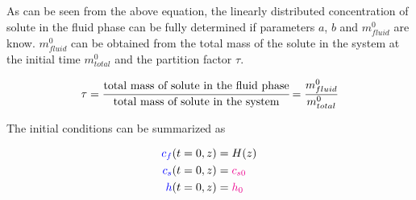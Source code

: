 \documentclass[../Article_Model_Parameters.tex]{subfiles}
\begin{document}
	As can be seen from the above equation, the linearly distributed concentration of solute in the fluid phase can be fully determined if parameters $a$, $b$ and $m_{fluid}^0$ are know. $m_{fluid}^0$ can be obtained from the total mass of the solute in the system at the initial time $m_{total}^0$ and the partition factor $\tau$.
	
	{\footnotesize
		\begin{equation*}
			\tau = \cfrac{\text{total mass of solute in the fluid phase}}{\text{total mass of solute in the system}} = \cfrac{m^0_{fluid}}{m^0_{total}}
		\end{equation*}
	}

	The initial conditions can be summarized as

	{\footnotesize
		\begin{subequations}
			\begin{align*}
				{\color{blue}c_f}(t = 0, z) &= H(z)   \\
				{\color{blue}c_s}(t = 0, z) &= {\color{magenta}c_{s0}} \\
				{\color{blue}h}(t = 0, z) &= {\color{magenta}h_0}
			\end{align*}
	\end{subequations} }
\end{document}
